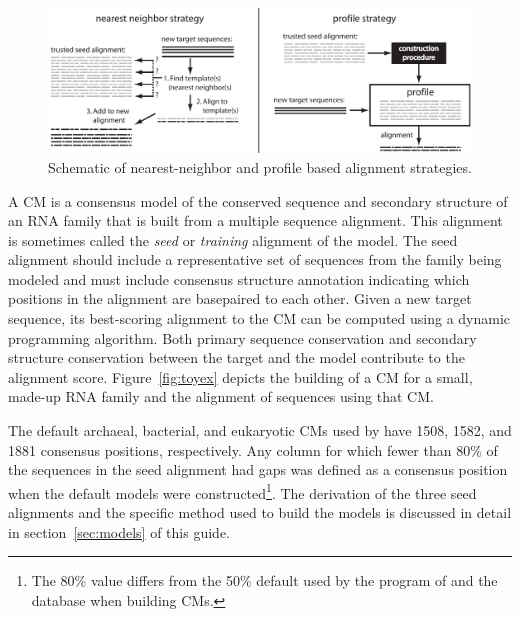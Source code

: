 \begin{figure}
  \begin{center}
\includegraphics[width=6in]{Figures/nnprof}
  \end{center}
  \caption{Schematic of nearest-neighbor and
        profile based alignment strategies.}
  \label{fig:nnprof}
\end{figure}

A CM is a consensus model of the conserved sequence and secondary
structure of an RNA family that is built from a multiple sequence
alignment. This alignment is sometimes called the \emph{seed} or
\emph{training} alignment of the model. The seed alignment should
include a representative set of sequences from the family being
modeled and must include consensus structure annotation indicating
which positions in the alignment are basepaired to each other.  Given
a new target sequence, its best-scoring alignment to the CM can be
computed using a dynamic programming algorithm. Both primary
sequence conservation and secondary structure conservation between the target
and the model contribute to the alignment score.
Figure~\ref{fig:toyex} depicts the building of a CM for a small,
made-up RNA family and the alignment of sequences using that CM.

The default archaeal, bacterial, and eukaryotic CMs used by
 have 1508, 1582, and 1881 consensus positions,
respectively. Any column for which fewer than 80\% of the sequences in
the seed alignment had gaps was defined as a consensus position when
the default models were constructed\footnote{The 80\% value differs
  from the 50\% default used by the  program of
   and the  database when building CMs.}.
The derivation of the three seed alignments and the specific method
used to build the models is discussed in detail in
section~\ref{sec:models} of this guide.


